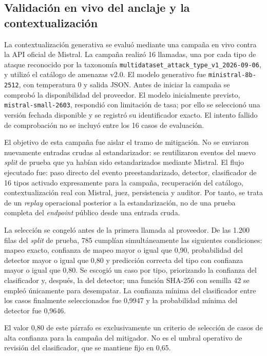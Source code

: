 \subsection*{Validación en vivo del anclaje y la contextualización}

La contextualización generativa se evaluó mediante una campaña en vivo contra
la API oficial de Mistral. La campaña realizó 16 llamadas, una por cada tipo de
ataque reconocido por la taxonomía
\texttt{multidataset\_attack\_type\_v1\_2026-09-06}, y utilizó el catálogo de
amenazas v2.0. El modelo generativo fue
\texttt{ministral-8b-2512}, con temperatura 0 y salida JSON. Antes de iniciar
la campaña se comprobó la disponibilidad del proveedor. El modelo inicialmente
previsto, \texttt{mistral-small-2603}, respondió con limitación de tasa; por
ello se seleccionó una versión fechada disponible y se registró su identificador
exacto. El intento fallido de comprobación no se incluyó entre los 16 casos de
evaluación.

El objetivo de esta campaña fue aislar el tramo de mitigación. No se enviaron
nuevamente entradas crudas al estandarizador: se reutilizaron eventos del nuevo
\textit{split} de prueba que ya habían sido estandarizados mediante Mistral. El
flujo ejecutado fue: paso directo del evento preestandarizado, detector,
clasificador de 16 tipos activado expresamente para la campaña, recuperación
del catálogo, contextualización real con Mistral, juez, persistencia y auditor.
Por tanto, se trata de un \emph{replay} operacional posterior a la
estandarización, no de una prueba completa del \textit{endpoint} público desde
una entrada cruda.

La selección se congeló antes de la primera llamada al proveedor. De las 1.200
filas del \textit{split} de prueba, 785 cumplían simultáneamente las siguientes
condiciones: mapeo exacto, confianza de mapeo mayor o igual que 0,90,
probabilidad del detector mayor o igual que 0,80 y predicción correcta del tipo
con confianza mayor o igual que 0,80. Se escogió un caso por tipo, priorizando
la confianza del clasificador y, después, la del detector; una función SHA-256
con semilla 42 se empleó únicamente para desempatar. La confianza mínima del
clasificador entre los casos finalmente seleccionados fue 0,9947 y la
probabilidad mínima del detector fue 0,9646.

El valor 0,80 de este párrafo es exclusivamente un criterio de selección de
casos de alta confianza para la campaña del mitigador. No es el umbral
operativo de revisión del clasificador, que se mantiene fijo en 0,65.

